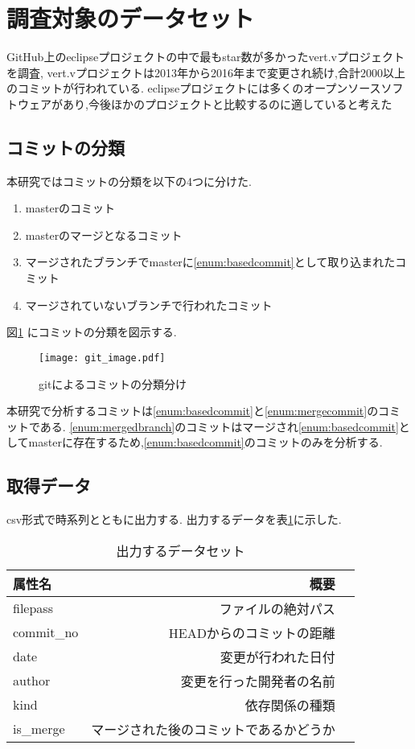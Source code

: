 \documentclass{fose2016}           %
\begin{document}
\section{調査対象のデータセット}\label{調査対象のデータセット}
GitHub上のeclipseプロジェクトの中で最もstar数が多かったvert.vプロジェクトを調査,
vert.vプロジェクトは2013年から2016年まで変更され続け,合計2000以上のコミットが行われている.
eclipseプロジェクトには多くのオープンソースソフトウェアがあり,今後ほかのプロジェクトと比較するのに適していると考えた

\subsection{コミットの分類}
本研究ではコミットの分類を以下の4つに分けた.

\begin{enumerate}
\item masterのコミット \label{enum:basedcommit}
\item masterのマージとなるコミット \label{enum:mergecommit}
\item マージされたブランチでmasterに\ref{enum:basedcommit}として取り込まれたコミット \label{enum:mergedbranch}
\item マージされていないブランチで行われたコミット
\end{enumerate}

図\ref{fig:gitimage} にコミットの分類を図示する.

\begin{figure}[t]
\centering
\texttt{[image: git\_image.pdf]}
\caption{gitによるコミットの分類分け}
\label{fig:gitimage} 
\end{figure}

本研究で分析するコミットは\ref{enum:basedcommit}と\ref{enum:mergecommit}のコミットである.
\ref{enum:mergedbranch}のコミットはマージされ\ref{enum:basedcommit}としてmasterに存在するため,\ref{enum:basedcommit}のコミットのみを分析する.

\subsection{取得データ}
csv形式で時系列とともに出力する.
出力するデータを表\ref{tab:初期データセット}に示した.


\begin{table}[htb]
\caption{出力するデータセット}
\begin{tabular}{|l|r|r|} \hline
属性名 & 概要 \\ \hline
filepass & ファイルの絶対パス \\ \hline
commit\_no & HEADからのコミットの距離 \\ \hline
date & 変更が行われた日付 \\ \hline
author & 変更を行った開発者の名前 \\ \hline
kind & 依存関係の種類 \\ \hline
is\_merge & マージされた後のコミットであるかどうか \\ \hline
\end{tabular}
\label{tab:初期データセット}
\end{table}
\end{document}
